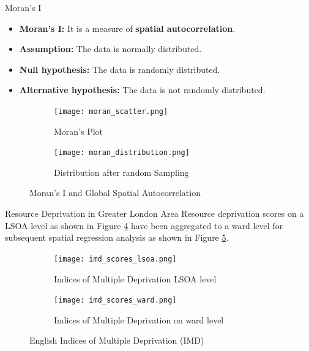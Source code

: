 \documentclass[10pt, aspectratio=169]{beamer}
\begin{document}
\begin{frame}{Moran's I}
    
    \begin{itemize}
        \item \textbf{Moran's I:} It is a measure of \textbf{spatial autocorrelation}. 
        \item \textbf{Assumption:} The data is normally distributed.
        \item \textbf{Null hypothesis:} The data is randomly distributed.
        \item \textbf{Alternative hypothesis:} The data is not randomly distributed.
    \end{itemize}
    \begin{figure}
        \centering
            \begin{subfigure}[t]{0.4\textwidth}
                \texttt{[image: moran\_scatter.png]}
                \caption{Moran's Plot}\label{fig:moran_scatter}
            \end{subfigure} 
            \begin{subfigure}[t]{0.4\textwidth}
                \texttt{[image: moran\_distribution.png]}
                \caption{Distribution after random Sampling}\label{fig:moran_distribution}
            \end{subfigure}
        \caption{Moran's I and Global Spatial Autocorrelation}\label{fig:moran}
    \end{figure}
\end{frame}

\begin{frame}{Resource Deprivation in Greater London Area}
    Resource deprivation scores on a LSOA level as shown in Figure \ref{fig:imd_scores_lsoa} 
    have been aggregated to a ward level for subsequent spatial regression analysis
    as shown in Figure \ref{fig:imd_scores_ward}.
    \begin{figure}
        \centering
            \begin{subfigure}[t]{0.4\textwidth}
                \texttt{[image: imd\_scores\_lsoa.png]}
                \caption{Indices of Multiple Deprivation LSOA level}\label{fig:imd_scores_lsoa}
            \end{subfigure}
            \begin{subfigure}[t]{0.4\textwidth}
                \texttt{[image: imd\_scores\_ward.png]}
                \caption{Indices of Multiple Deprivation on ward level}\label{fig:imd_scores_ward}
            \end{subfigure}
        \caption{English Indices of Multiple Deprivation (IMD)}\label{fig:imd}
    \end{figure}
\end{frame}
\end{document}
